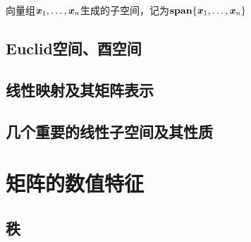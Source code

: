 \begin{definition}[线性子空间]
    向量组$\boldsymbol{\mathit{x}}_1, \ldots, \boldsymbol{\mathit{x}}_n$生成的子空间，记为$\textbf{span}\{\boldsymbol{\mathit{x}}_1, \ldots, \boldsymbol{\mathit{x}}_n\}$
\end{definition}

\begin{definition}
\end{definition}

\subsection{Euclid空间、酉空间}
\label{sub:Euclid空间、酉空间}

\begin{definition}
\end{definition}

\begin{definition}
\end{definition}

\subsection{线性映射及其矩阵表示}
\label{sub:线性映射及其矩阵表示}

\begin{definition}
\end{definition}

\begin{definition}
\end{definition}

\begin{definition}
\end{definition}

\subsection{几个重要的线性子空间及其性质}
\label{sub:几个重要的线性子空间及其性质}

\begin{definition}
\end{definition}

\begin{definition}
\end{definition}

\section{矩阵的数值特征}
\label{sec:矩阵的数值特征}

\subsection{秩}
\label{sub:秩}

